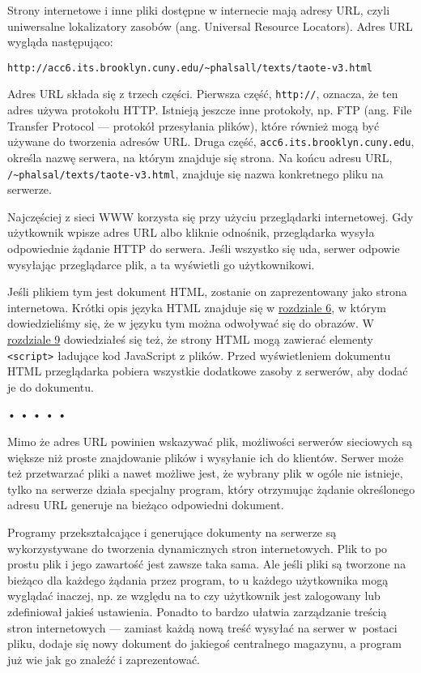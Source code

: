   
Strony internetowe i inne pliki dostępne w internecie mają adresy URL, czyli uniwersalne lokalizatory zasobów (ang. Universal Resource Locators). Adres URL wygląda następująco:

  
\begin{verbatim} 
http://acc6.its.brooklyn.cuny.edu/~phalsall/texts/taote-v3.html
 \end{verbatim}
  
Adres URL składa się z trzech części. Pierwsza część, \texttt{http://}, oznacza, że ten adres używa protokołu HTTP. Istnieją jeszcze inne protokoły, np. FTP (ang. File Transfer Protocol — protokół przesyłania plików), które również mogą być używane do tworzenia adresów URL. Druga część, \texttt{acc6.its.brooklyn.cuny.edu}, określa nazwę serwera, na którym znajduje się strona. Na końcu adresu URL, \texttt{/\textasciitilde phalsal/texts/taote-v3.html}, znajduje się nazwa konkretnego pliku na serwerze.

  
Najczęściej z sieci WWW korzysta się przy użyciu przeglądarki internetowej. Gdy użytkownik wpisze adres URL albo kliknie odnośnik, przeglądarka wysyła odpowiednie żądanie HTTP do serwera. Jeśli wszystko się uda, serwer odpowie wysyłając przeglądarce plik, a ta wyświetli go użytkownikowi.

  
Jeśli plikiem tym jest dokument HTML, zostanie on zaprezentowany jako strona internetowa. Krótki opis języka HTML znajduje się w \hyperref[chap:6]{rozdziale 6}, w którym dowiedzieliśmy się, że w języku tym można odwoływać się do obrazów. W \hyperref[chap:9]{rozdziale 9} dowiedziałeś się też, że strony HTML mogą zawierać elementy \texttt{<script>} ładujące kod JavaScript z plików. Przed wyświetleniem dokumentu HTML przeglądarka pobiera wszystkie dodatkowe zasoby z serwerów, aby dodać je do dokumentu.



\begin{center}
• • • • •
\end{center}

  
Mimo że adres URL powinien wskazywać plik, możliwości serwerów sieciowych są większe niż proste znajdowanie plików i wysyłanie ich do klientów. Serwer może też przetwarzać pliki a nawet możliwe jest, że wybrany plik w ogóle nie istnieje, tylko na serwerze działa specjalny program, który otrzymując żądanie określonego adresu URL generuje na bieżąco odpowiedni dokument.

  
Programy przekształcające i generujące dokumenty na serwerze są wykorzystywane do tworzenia dynamicznych stron internetowych. Plik to po prostu plik i jego zawartość jest zawsze taka sama. Ale jeśli pliki są tworzone na bieżąco dla każdego żądania przez program, to u każdego użytkownika mogą wyglądać inaczej, np. ze względu na to czy użytkownik jest zalogowany lub zdefiniował jakieś ustawienia. Ponadto to bardzo ułatwia zarządzanie treścią stron internetowych — zamiast każdą nową treść wysyłać na serwer w~postaci pliku, dodaje się nowy dokument do jakiegoś centralnego magazynu, a program już wie jak go znaleźć i zaprezentować.

